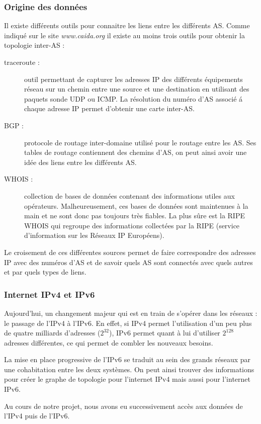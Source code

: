 \subsubsection{Origine des donn\'ees}
\par
Il existe diff\'erents outils pour connaitre les liens entre les diff\'erents AS. Comme indiqu\'e sur le site \textit{www.caida.org} il existe au moins trois outils pour obtenir la topologie inter-AS :
\begin{description}
 \item[traceroute : ] outil permettant de capturer les adresses IP des diff\'erents \'equipements r\'eseau sur un chemin entre une source et une destination en utilisant des paquets sonde UDP ou ICMP. La r\'esolution du num\'ero d'AS associ\'e \'a chaque adresse IP permet d'obtenir une carte inter-AS.
 \item[BGP : ] protocole de routage inter-domaine utilis\'e pour le routage entre les AS. Ses tables de routage contiennent des chemins d'AS, on peut ainsi avoir une idée des liens entre les diff\'erents AS.
 \item[WHOIS : ] collection de bases de donn\'ees contenant des informations utiles aux op\'erateurs. Malheureusement, ces bases de donn\'ees sont maintenues \`a la main et ne  sont donc pas toujours tr\`es fiables. La plus sûre est la RIPE WHOIS qui regroupe des informations collect\'ees par la RIPE (service d'information sur les R\'eseaux IP Europ\'eens).
\end{description}
\par
Le croisement de ces diff\'erentes sources permet de faire correspondre des adresses IP avec des num\'eros d'AS et de savoir quels AS sont connect\'es avec quels autres et par quels types de liens.

\subsubsection{Internet IPv4 et IPv6}
\par
Aujourd'hui, un changement majeur qui est en train de s'op\'erer dans les r\'eseaux : le passage de l'IPv4 \`a l'IPv6. En effet, si IPv4 permet l'utilisation d'un peu plus de quatre milliards d'adresses ($2^{32}$), IPv6 permet quant \`a lui d'utiliser $2^{128}$ adresses diff\'erentes, ce qui permet de combler les nouveaux besoins.
\par
La mise en place progressive de l'IPv6 se traduit au sein des grands r\'eseaux par une cohabitation entre les deux syst\`emes. On peut ainsi trouver des informations pour cr\'eer le graphe de topologie pour l'internet IPv4 mais aussi pour l'internet IPv6.
\par
Au cours de notre projet, nous avons eu successivement acc\`es aux donn\'ees de l'IPv4 puis de l'IPv6.
% 
